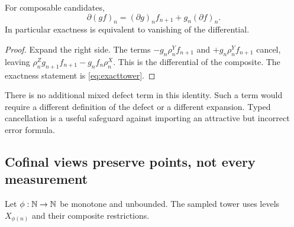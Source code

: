 \begin{proposition}\label{KS17}
For composable candidates,
\[
 \partial(gf)_n=(\partial g)_nf_{n+1}+g_n(\partial f)_n.
\]
In particular exactness is equivalent to vanishing of the differential.
\end{proposition}
\begin{proof}
Expand the right side. The terms \(-g_n\rho^Y_nf_{n+1}\) and \(+g_n\rho^Y_nf_{n+1}\) cancel, leaving \(\rho^Z_ng_{n+1}f_{n+1}-g_nf_n\rho^X_n\). This is the differential of the composite. The exactness statement is \eqref{eq:exacttower}.
\end{proof}
There is no additional mixed defect term in this identity. Such a term would require a different definition of the defect or a different expansion. Typed cancellation is a useful safeguard against importing an attractive but incorrect error formula.

\subsection{Cofinal views preserve points, not every measurement}
Let \(\phi:\mathbb N\to\mathbb N\) be monotone and unbounded. The sampled tower uses levels \(X_{\phi(n)}\) and their composite restrictions.

